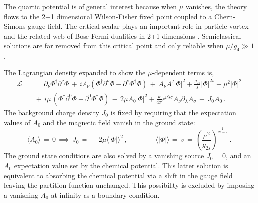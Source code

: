 \documentclass[12pt,a4paper]{article}
\def\be{\begin{equation}}
\def\ee{\end{equation}}
\newcommand{\bea}{\begin{eqnarray}}
\newcommand{\eea}{\end{eqnarray}}
\begin{document}
The quartic potential is of general interest because when $\mu$  vanishes, the theory flows to the 2+1 dimensional Wilson-Fisher fixed point coupled to a Chern-Simons gauge field. The critical scalar plays an important role in particle-vortex and the related web of Bose-Fermi dualities in 2+1 dimensions \cite{Aharony:2015mjs}. Semiclassical solutions are far removed from this critical point and only reliable when $\mu/g_4 \gg 1$.

 The Lagrangian density expanded to show the $\mu$-dependent terms is,
 \bea
 \mathcal{L} &&=\, \partial_{\nu} \Phi^{\dag}\partial^{\nu} \Phi \,+\,i A_{\nu} \left( \Phi^{\dag} \partial^{\nu} \Phi - \partial^{\nu}\Phi^{\dag} \Phi \right)\,+\,A_{\nu} A^{\nu} \left|\Phi \right|^2 +\frac{g_{2s}}{s}|\Phi|^{2s}- \mu^2 \left|\Phi \right|^2\nonumber \\\label{lagfull}
&&\,+\,i \mu\, \left(\Phi^{\dag} \partial^{0} \Phi -\partial^{0} \Phi^{\dag} \Phi  \right) \,-\, 2 \mu A_{0} \left|\Phi \right|^2 + \frac{k}{4 \pi} \epsilon^{\nu\lambda \sigma} A_{\nu} \partial_{\lambda} A_{\sigma}\, -\, J_0 A_0\,.
\eea
The background charge density $J_0$ is fixed by requiring that the expectation values of $A_0$ and the magnetic field vanish in the ground state:
\be
\langle A_0\rangle\,=\,0\,\implies\, J_0\,=\,-2\mu\langle|\Phi|\rangle^2\,,\qquad\qquad \langle|\Phi|\rangle\,=\,v\,=\,\left(\frac{\mu^2}{g_{2s}}\right)^{\frac{1}{2s-2}}\,.
\ee
The ground state conditions are also solved by a vanishing source $J_0=0$, and an  $A_0$ expectation value set by the chemical potential. This latter solution is equivalent to absorbing the chemical potential via a shift in the gauge field leaving the partition function unchanged. This possibility is excluded by imposing a vanishing $A_0$  at infinity as a boundary condition.
\end{document}
